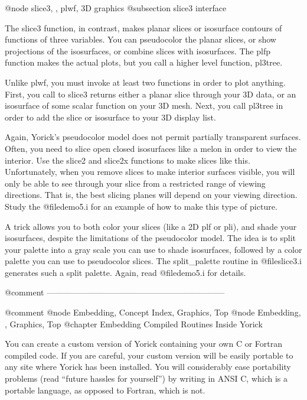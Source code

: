 @node slice3,  , plwf, 3D graphics
@subsection slice3 interface

The slice3 function, in contrast, makes planar slices or isosurface
contours of functions of three variables.  You can pseudocolor the
planar slices, or show projections of the isosurfaces, or combine
slices with isosurfaces.  The plfp function makes the actual plots,
but you call a higher level function, pl3tree.

Unlike plwf, you must invoke at least two functions in order to plot
anything.  First, you call to slice3 returns either a planar slice
through your 3D data, or an isosurface of some scalar function on your
3D mesh.  Next, you call pl3tree in order to add the slice or
isosurface to your 3D display list.

Again, Yorick's pseudocolor model does not permit partially transparent
surfaces.  Often, you need to slice open closed isosurfaces like a melon
in order to view the interior.  Use the slice2 and slice2x functions to
make slices like this.  Unfortunately, when you remove slices to make
interior surfaces visible, you will only be able to see through your
slice from a restricted range of viewing directions.  That is, the best
slicing planes will depend on your viewing direction.  Study the
@file{demo5.i} for an example of how to make this type of picture.

A trick allows you to both color your slices (like a 2D plf or pli), and
shade your isosurfaces, despite the limitations of the pseudocolor
model.  The idea is to split your palette into a gray scale you can use
to shade isosurfaces, followed by a color palette you can use to
pseudocolor slices.  The split_palette routine in @file{slice3.i}
generates such a split palette.  Again, read @file{demo5.i} for
details.




@comment -----------------------------------------------------------------

@comment @node Embedding, Concept Index, Graphics, Top
@node Embedding, , Graphics, Top
@chapter Embedding Compiled Routines Inside Yorick

You can create a custom version of Yorick containing your own C or
Fortran compiled code.  If you are careful, your custom version will be
easily portable to any site where Yorick has been installed.  You will
considerably ease portability problems (read ``future hassles for
yourself'') by writing in ANSI C, which is a portable language, as
opposed to Fortran, which is not.

